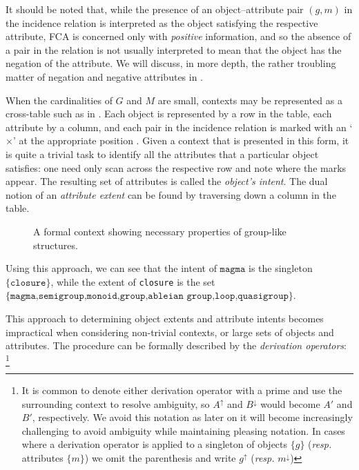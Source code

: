 It should be noted that, while the presence of an object--attribute pair $(g,m)$ in the incidence relation is interpreted as the object satisfying the respective attribute, FCA is concerned only with
\textit{positive} information, and so the absence of a pair in the relation is not usually interpreted to mean that the object has the negation of the attribute. We will discuss, in more depth, the rather
troubling matter of negation and negative attributes in .

When the cardinalities of $G$ and $M$ are small, contexts may be represented as a cross-table such as in . Each object is represented by a row in the table, each attribute by a
column, and each pair in the incidence relation is marked with an `$\times$' at the appropriate position \cite[pp. 17]{ganter1999formal}. Given a context that is presented in this form, it is quite a trivial
task to identify all the attributes that a particular object satisfies: one need only scan across the respective row and note where the marks appear. The resulting set of attributes is called the \textit{object's
intent}. The dual notion of an \textit{attribute extent} can be found by traversing down a column in the table.

\begin{figure}[H]
  \centering
  \small
  \begin{cxt}
    \label{cxt:grouplikes}      
          
      
  \end{cxt}
  \caption{A formal context showing necessary properties of group-like structures.}
  \label{context:formal-context-group-structures}
\end{figure}

Using this approach, we can see that the intent of $\texttt{magma}$ is the singleton $\{\texttt{closure}\}$, while the extent of \texttt{closure} is the set
$\{\texttt{magma,semigroup,monoid,group,ableian group,loop,quasigroup}\}$.

This approach to determining object extents and attribute intents becomes impractical when considering non-trivial contexts, or large sets of objects and attributes. The procedure can be formally
described by the \textit{derivation operators}: \footnote{It is common to denote either derivation operator with a prime and use the surrounding context to resolve ambiguity, so $A^{\uparrow}$ and $B^{\downarrow}$
would become $A'$ and $B'$, respectively. We avoid this notation as later on it will become increasingly challenging to avoid ambiguity while maintaining pleasing notation. In cases where a derivation
operator is applied to a singleton of objects $\{g\}$ (\textit{resp.} attributes $\{m\}$) we omit the parenthesis and write $g^{\uparrow}$ (\textit{resp.} $m^{\downarrow}$)}


